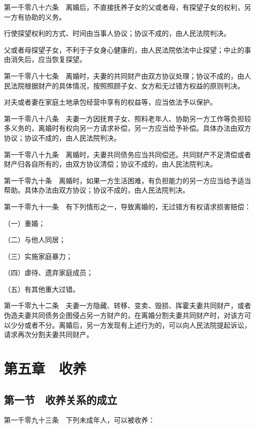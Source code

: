 \documentclass[UTF8,12pt,a4paper]{ctexbook}
\begin{document}
第一千零八十六条　离婚后，不直接抚养子女的父或者母，有探望子女的权利，另一方有协助的义务。

行使探望权利的方式、时间由当事人协议；协议不成的，由人民法院判决。

父或者母探望子女，不利于子女身心健康的，由人民法院依法中止探望；中止的事由消失后，应当恢复探望。

第一千零八十七条　离婚时，夫妻的共同财产由双方协议处理；协议不成的，由人民法院根据财产的具体情况，按照照顾子女、女方和无过错方权益的原则判决。

对夫或者妻在家庭土地承包经营中享有的权益等，应当依法予以保护。

第一千零八十八条　夫妻一方因抚育子女、照料老年人、协助另一方工作等负担较多义务的，离婚时有权向另一方请求补偿，另一方应当给予补偿。具体办法由双方协议；协议不成的，由人民法院判决。

第一千零八十九条　离婚时，夫妻共同债务应当共同偿还。共同财产不足清偿或者财产归各自所有的，由双方协议清偿；协议不成的，由人民法院判决。

第一千零九十条　离婚时，如果一方生活困难，有负担能力的另一方应当给予适当帮助。具体办法由双方协议；协议不成的，由人民法院判决。

第一千零九十一条　有下列情形之一，导致离婚的，无过错方有权请求损害赔偿：

（一）重婚；

（二）与他人同居；

（三）实施家庭暴力；

（四）虐待、遗弃家庭成员；

（五）有其他重大过错。

第一千零九十二条　夫妻一方隐藏、转移、变卖、毁损、挥霍夫妻共同财产，或者伪造夫妻共同债务企图侵占另一方财产的，在离婚分割夫妻共同财产时，对该方可以少分或者不分。离婚后，另一方发现有上述行为的，可以向人民法院提起诉讼，请求再次分割夫妻共同财产。

\section*{第五章　收养}

\subsection*{第一节　收养关系的成立}

第一千零九十三条　下列未成年人，可以被收养：
\end{document}
